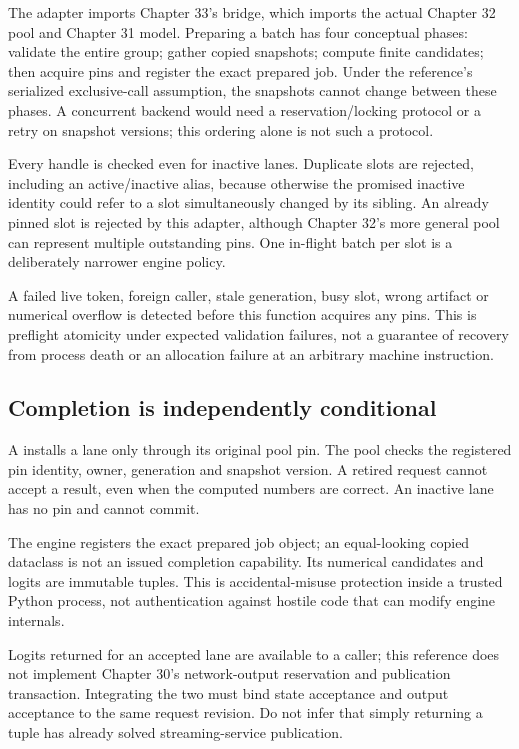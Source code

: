The adapter imports Chapter 33's bridge, which imports the actual Chapter 32
pool and Chapter 31 model. Preparing a batch has four conceptual phases:
validate the entire group; gather copied snapshots; compute finite candidates;
then acquire pins and register the exact prepared job. Under the reference's
serialized exclusive-call assumption, the snapshots cannot change between
these phases. A concurrent backend would need a reservation/locking protocol
or a retry on snapshot versions; this ordering alone is not such a protocol.

Every handle is checked even for inactive lanes. Duplicate slots are rejected,
including an active/inactive alias, because otherwise the promised inactive
identity could refer to a slot simultaneously changed by its sibling.
An already pinned slot is rejected by this adapter, although Chapter 32's
more general pool can represent multiple outstanding pins. One in-flight
batch per slot is a deliberately narrower engine policy.


A failed live token, foreign caller, stale generation, busy slot, wrong
artifact or numerical overflow is detected before this function acquires
any pins. This is preflight atomicity under expected validation failures,
not a guarantee of recovery from process death or an allocation failure at
an arbitrary machine instruction.

\subsection{Completion is independently conditional}
A  installs a lane only through its original pool pin.
The pool checks the registered pin identity, owner, generation and snapshot
version. A retired request cannot accept a result, even when the computed
numbers are correct. An inactive lane has no pin and cannot commit.


The engine registers the exact prepared job object; an equal-looking copied
dataclass is not an issued completion capability. Its numerical candidates
and logits are immutable tuples. This is accidental-misuse protection inside
a trusted Python process, not authentication against hostile code that can
modify engine internals.

Logits returned for an accepted lane are available to a caller; this reference
does not implement Chapter 30's network-output reservation and publication
transaction. Integrating the two must bind state acceptance and output
acceptance to the same request revision. Do not infer that simply returning
a tuple has already solved streaming-service publication.


